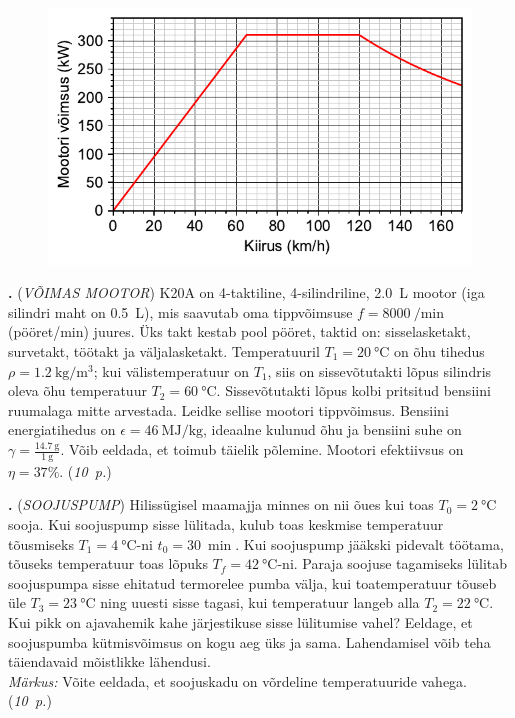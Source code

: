 \documentclass[11pt,a5paper]{article}
\newcommand{\numb}[1]{\vspace{5pt}\textbf{\large #1}}
\newcommand{\nimi}[1]{(\textsl{\small #1})}
\newcommand{\punktid}[1]{(\emph{#1~p.})}
\newcounter{ylesanne}
\newcommand{\yl}[1]{\addtocounter{ylesanne}{1}\numb{\theylesanne.} \nimi{#1} \newblock{}}
\newcommand{\autor}[1]{}%
\begin{document}
\begin{figure}[h]
    \centering
    \vspace{-10pt}
    \includegraphics[width=0.75\linewidth]{elektriauto_joonis.pdf}
    \vspace{-35pt}
\end{figure}

\newpage

\yl{VÕIMAS MOOTOR}
K20A on 4-taktiline, 4-silindriline, \SI{2,0}{\liter} mootor (iga silindri maht on \SI{0,5}{\liter}), mis saavutab oma tippvõimsuse $f= \SI{8000}{\per\minute}$ (pööret/min) juures. Üks takt kestab pool pööret, taktid on: sisselasketakt, survetakt, töötakt ja väljalasketakt.
Temperatuuril $T_1=\SI{20}\celsius$ on õhu tihedus $\rho=\SI{1.2}{\kg\per\m\cubed}$; kui välistemperatuur on $T_1$, siis on sissevõtutakti lõpus silindris oleva õhu temperatuur $T_2=\SI{60}\celsius$.  Sissevõtutakti lõpus kolbi pritsitud bensiini ruumalaga mitte arvestada. Leidke sellise mootori tippvõimsus.
Bensiini energiatihedus on $\epsilon = \SI{46}{\mega\joule\per\kilogram}$, ideaalne kulunud õhu ja bensiini suhe on $\gamma = \frac{\SI{14,7}{\gram}}{\SI{1}{\gram}}$. Võib eeldada, et toimub täielik põlemine. Mootori efektiivsus on $\eta=37\%$.
\punktid{10} \autor{Marten Rannut}





\yl{SOOJUSPUMP} 
Hilissügisel maamajja minnes on nii õues kui toas $T_0=\SI {2}{\celsius}$ sooja. Kui soojuspump sisse lülitada, kulub toas keskmise temperatuur  tõusmiseks $T_1=\SI {4}{\celsius}$-ni $t_0=\SI{30}{\min}$. Kui soojuspump jääkski pidevalt töötama, tõuseks temperatuur toas lõpuks $T_f=\SI {42}{\celsius}$-ni. Paraja soojuse tagamiseks lülitab soojuspumpa sisse ehitatud termorelee pumba välja, kui toatemperatuur tõuseb üle $T_3=\SI{23}\celsius$ ning uuesti sisse tagasi, kui temperatuur langeb alla $T_2=\SI{22}{\celsius}$. Kui pikk on ajavahemik kahe järjestikuse sisse lülitumise vahel? Eeldage, et soojuspumba kütmisvõimsus on kogu aeg üks ja sama. Lahendamisel võib teha täiendavaid mõistlikke lähendusi.\\ \emph{Märkus:} Võite eeldada, et soojuskadu on võrdeline temperatuuride vahega.
\punktid{10} \autor{Jaan Kalda}
\end{document}
